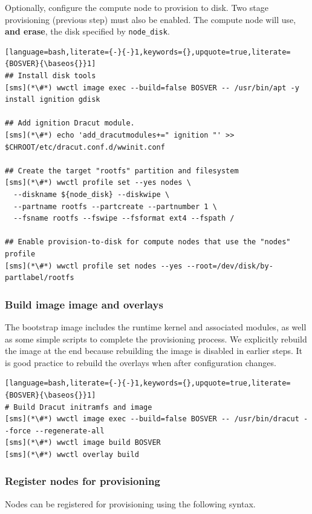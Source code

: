 Optionally, configure the compute node to provision to disk. Two stage
provisioning (previous step) must also be enabled. The compute node will use,
\textbf{and erase}, the disk specified by \texttt{node\_disk}.

\begin{lstlisting}[language=bash,literate={-}{-}1,keywords={},upquote=true,literate={BOSVER}{\baseos{}}1]
## Install disk tools
[sms](*\#*) wwctl image exec --build=false BOSVER -- /usr/bin/apt -y install ignition gdisk

## Add ignition Dracut module.
[sms](*\#*) echo 'add_dracutmodules+=" ignition "' >> $CHROOT/etc/dracut.conf.d/wwinit.conf

## Create the target "rootfs" partition and filesystem
[sms](*\#*) wwctl profile set --yes nodes \
  --diskname ${node_disk} --diskwipe \
  --partname rootfs --partcreate --partnumber 1 \
  --fsname rootfs --fswipe --fsformat ext4 --fspath /

## Enable provision-to-disk for compute nodes that use the "nodes" profile
[sms](*\#*) wwctl profile set nodes --yes --root=/dev/disk/by-partlabel/rootfs
\end{lstlisting}

\subsubsection{Build image image and overlays}

The bootstrap image includes the runtime kernel and associated modules, as well
as some simple scripts to complete the provisioning process. We explicitly rebuild
the image at the end because rebuilding the image is disabled in earlier steps.
It is good practice to rebuild the overlays when after configuration changes.

\begin{lstlisting}[language=bash,literate={-}{-}1,keywords={},upquote=true,literate={BOSVER}{\baseos{}}1]
# Build Dracut initramfs and image
[sms](*\#*) wwctl image exec --build=false BOSVER -- /usr/bin/dracut --force --regenerate-all
[sms](*\#*) wwctl image build BOSVER
[sms](*\#*) wwctl overlay build
\end{lstlisting}

\subsubsection{Register nodes for provisioning}

Nodes can be registered for provisioning using the following syntax.
